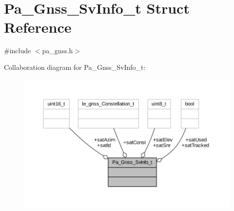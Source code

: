 \hypertarget{struct_pa___gnss___sv_info__t}{}\section{Pa\+\_\+\+Gnss\+\_\+\+Sv\+Info\+\_\+t Struct Reference}
\label{struct_pa___gnss___sv_info__t}


{\ttfamily \#include $<$pa\+\_\+gnss.\+h$>$}



Collaboration diagram for Pa\+\_\+\+Gnss\+\_\+\+Sv\+Info\+\_\+t\+:
\nopagebreak
\begin{figure}[H]
\begin{center}
\leavevmode
\includegraphics[width=350pt]{struct_pa___gnss___sv_info__t__coll__graph}
\end{center}
\end{figure}
